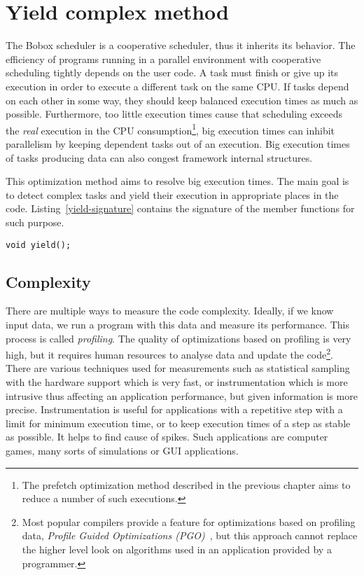 \chapter{Yield complex method}
\label{yield-intro}
The Bobox scheduler is a cooperative scheduler, thus it inherits its behavior. The efficiency of programs running in a parallel environment with cooperative scheduling tightly depends on the user code. A task must finish or give up its execution in order to execute a different task on the same CPU. If tasks depend on each other in some way, they should keep balanced execution times as much as possible. Furthermore, too little execution times cause that scheduling exceeds the \textit{real} execution in the CPU consumption\footnote{The prefetch optimization method described in the previous chapter aims to reduce a number of such executions.}, big execution times can inhibit parallelism by keeping dependent tasks out of an execution. Big execution times of tasks producing data can also congest framework internal structures.

This optimization method aims to resolve big execution times. The main goal is to detect complex tasks and yield their execution in appropriate places in the code. Listing~\ref{yield-signature} contains the signature of the  member functions for such purpose.

\begin{lstlisting}[caption={The signature of the yield execution function.}, label={yield-signature}]
void yield();
\end{lstlisting}

\section{Complexity}
\label{yield-complexity}
There are multiple ways to measure the code complexity. Ideally, if we know input data, we run a program with this data and measure its performance. This process is called \emph{profiling}. The quality of optimizations based on profiling is very high, but it requires human resources to analyse data and update the code\footnote{Most popular compilers provide a feature for optimizations based on profiling data, \emph{Profile Guided Optimizations (PGO)}~\cite{pgo}, but this approach cannot replace the higher level look on algorithms used in an application provided by a programmer.}. There are various techniques used for measurements such as statistical sampling with the hardware support which is very fast, or instrumentation which is more intrusive thus affecting an application performance, but given information is more precise. Instrumentation is useful for applications with a repetitive step with a limit for minimum execution time, or to keep execution times of a step as stable as possible. It helps to find cause of spikes. Such applications are computer games, many sorts of simulations or GUI applications.

